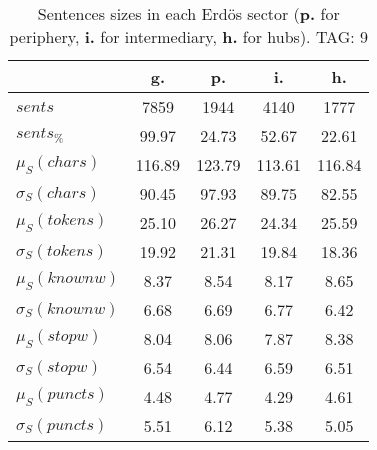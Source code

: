 \begin{table}[h!]
\begin{center}
\begin{tabular}{| l || c | c | c | c |}\hline
 & {\bf g.} & {\bf p.} & {\bf i.} & {\bf h.} \\\hline\hline
$sents$ & 7859  & 1944  & 4140  & 1777 \\
$sents_{\%}$ & 99.97  & 24.73  & 52.67  & 22.61 \\\hline
$\mu_S(chars)$ & 116.89  & 123.79  & 113.61  & 116.84 \\
$\sigma_S(chars)$ & 90.45  & 97.93  & 89.75  & 82.55 \\\hline
$\mu_S(tokens)$ & 25.10  & 26.27  & 24.34  & 25.59 \\
$\sigma_S(tokens)$ & 19.92  & 21.31  & 19.84  & 18.36 \\\hline
$\mu_S(knownw)$ & 8.37  & 8.54  & 8.17  & 8.65 \\
$\sigma_S(knownw)$ & 6.68  & 6.69  & 6.77  & 6.42 \\\hline
$\mu_S(stopw)$ & 8.04  & 8.06  & 7.87  & 8.38 \\
$\sigma_S(stopw)$ & 6.54  & 6.44  & 6.59  & 6.51 \\\hline
$\mu_S(puncts)$ & 4.48  & 4.77  & 4.29  & 4.61 \\
$\sigma_S(puncts)$ & 5.51  & 6.12  & 5.38  & 5.05 \\\hline
\end{tabular}
\caption{Sentences sizes in each Erd\"os sector ({{\bf p.}} for periphery, {{\bf i.}} for intermediary, {{\bf h.}} for hubs). TAG: 9}
\end{center}
\end{table}